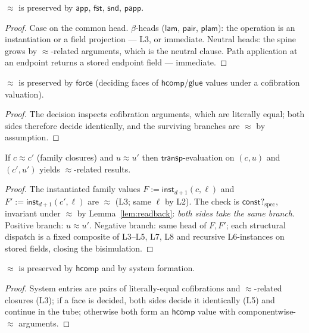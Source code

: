 \documentclass{lmcs}
\newcommand{\transp}{\mathsf{transp}}
\newcommand{\hcomp}{\mathsf{hcomp}}
\newcommand{\glue}{\mathsf{glue}}
\newcommand{\repeq}{\approx}
\providecommand{\fst}{}\renewcommand{\fst}{\mathsf{fst}}
\providecommand{\snd}{}\renewcommand{\snd}{\mathsf{snd}}
\newcommand{\constspec}{\mathsf{const?}_{\mathrm{spec}}}
\newcommand{\capp}{\mathsf{inst}}
\begin{document}
\begin{lem}\label{lem:L4}
  $\repeq$ is preserved by $\mathsf{app}$, $\fst$, $\snd$,
  $\mathsf{papp}$.
\end{lem}
\begin{proof}
  Case on the common head.  $\beta$-heads ($\mathsf{lam}$,
  $\mathsf{pair}$, $\mathsf{plam}$): the operation is an
  instantiation or a field projection --- L3, or immediate.  Neutral
  heads: the spine grows by $\repeq$-related arguments, which is the
  neutral clause.  Path application at an endpoint returns a stored
  endpoint field --- immediate.
\end{proof}

\begin{lem}\label{lem:L5}
  $\repeq$ is preserved by $\mathsf{force}$ (deciding faces of
  $\hcomp$/$\glue$ values under a cofibration valuation).
\end{lem}
\begin{proof}
  The decision inspects cofibration arguments, which are literally
  equal; both sides therefore decide identically, and the surviving
  branches are $\repeq$ by assumption.
\end{proof}

\begin{lem}\label{lem:L6}
  If $c \repeq c'$ (family closures) and $u \repeq u'$ then
  $\transp$-evaluation on $(c, u)$ and $(c', u')$ yields
  $\repeq$-related results.
\end{lem}
\begin{proof}
  The instantiated family values $F := \capp_{d+1}(c, \ell)$ and
  $F' := \capp_{d+1}(c', \ell)$ are $\repeq$ (L3; same $\ell$ by
  L2).  The check is $\constspec$, invariant under $\repeq$ by
  Lemma~\ref{lem:readback}: \emph{both sides take the same branch}.
  Positive branch: $u \repeq u'$.  Negative branch: same head of $F,
  F'$; each structural dispatch is a fixed composite of L3--L5, L7,
  L8 and recursive L6-instances on stored fields, closing the
  bisimulation.
\end{proof}

\begin{lem}\label{lem:L7}
  $\repeq$ is preserved by $\hcomp$ and by system formation.
\end{lem}
\begin{proof}
  System entries are pairs of literally-equal cofibrations and
  $\repeq$-related closures (L3); if a face is decided, both sides
  decide it identically (L5) and continue in the tube; otherwise both
  form an $\hcomp$ value with componentwise-$\repeq$ arguments.
\end{proof}
\end{document}
